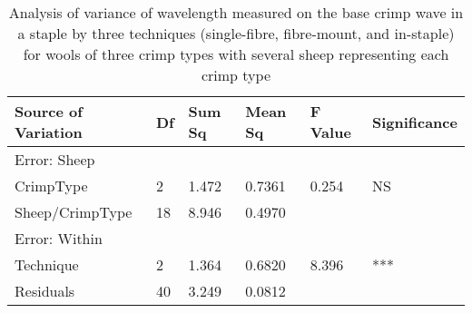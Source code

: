 %

\begin{table}[htp]
\centering
\caption{Analysis of variance of wavelength measured on the base crimp wave in a staple by three techniques (single-fibre, fibre-mount, and in-staple) for wools of three crimp types with several sheep representing each crimp type}
\label{tab:fwwavlaov}
\vspace{0.1in}
\begin{tabular}{|p{1.3in}|p{0.4in}|p{0.4in}|p{0.4in}|p{0.4in}|p{0.8in}|} \hline
     Source of Variation & Df & Sum Sq  & Mean Sq  & F Value  & Significance  \\  \hline
 Error: Sheep & & & & & \\
 CrimpType & 2 & 1.472 & 0.7361 & 0.254 & NS  \\
 Sheep/CrimpType & 18 & 8.946 & 0.4970 &  &  \\ 
 Error: Within & & & & & \\
 Technique & 2 & 1.364 & 0.6820 & 8.396  & ***  \\
 Residuals & 40 & 3.249 & 0.0812 & & \\ \hline
\end{tabular}
\end{table}

%
